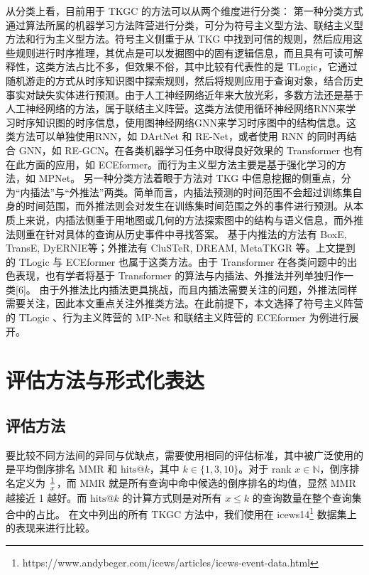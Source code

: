 \documentclass[a4paper, AutoFakeBold]{article}
\begin{document}
从分类上看，目前用于 TKGC 的方法可以从两个维度进行分类：
第一种分类方式通过算法所属的机器学习方法阵营进行分类，可分为符号主义型方法、联结主义型方法和行为主义型方法。符号主义侧重于从 TKG 中找到可信的规则，然后应用这些规则进行时序推理，其优点是可以发掘图中的固有逻辑信息，而且具有可读可解释性，这类方法占比不多，但效果不俗，其中比较有代表性的是 TLogic，它通过随机游走的方式从时序知识图中探索规则，然后将规则应用于查询对象，结合历史事实对缺失实体进行预测。由于人工神经网络近年来大放光彩，多数方法还是基于人工神经网络的方法，属于联结主义阵营。这类方法使用循环神经网络RNN来学习时序知识图的时序信息，使用图神经网络GNN来学习时序图中的结构信息。这类方法可以单独使用RNN，如 DArtNet\cite{5-2020} 和 RE-Net\cite{12-2020RefBlue}，或者使用 RNN 的同时再结合 GNN，如 RE-GCN\cite{7-2021}。在各类机器学习任务中取得良好效果的 Transformer 也有在此方面的应用，如 ECEformer\cite{6-2024RefBlue}。而行为主义型方法主要是基于强化学习的方法，如 MPNet\cite{4-2024RefBlue}。
另一种分类方法着眼于方法对 TKG 中信息挖掘的侧重点，分为“内插法”与“外推法”两类。简单而言，内插法预测的时间范围不会超过训练集自身的时间范围，而外推法则会对发生在训练集时间范围之外的事件进行预测。从本质上来说，内插法侧重于用地图或几何的方法探索图中的结构与语义信息，而外推法则重在针对具体的查询从历史事件中寻找答案。
基于内推法的方法有 BoxE\cite{14-2020}, TransE\cite{15-2024}, DyERNIE\cite{16-2020}等；外推法有 CluSTeR\cite{17-2021}, DREAM\cite{18-2023}, MetaTKGR\cite{13-2022} 等。上文提到的 TLogic 与 ECEformer 也属于这类方法。由于 Transformer 在各类问题中的出色表现，也有学者将基于 Transformer 的算法与内插法、外推法并列单独归作一类[6]。
由于外推法比内插法更具挑战，而且内插法需要关注的问题，外推法同样需要关注，因此本文重点关注外推类方法。在此前提下，本文选择了符号主义阵营的 TLogic 、行为主义阵营的 MP-Net 和联结主义阵营的 ECEformer 为例进行展开。


\section{评估方法与形式化表达}

\subsection{评估方法}

要比较不同方法间的异同与优缺点，需要使用相同的评估标准，其中被广泛使用的是平均倒序排名 MMR 和 $\text{hits}@k$，其中 $k\in\{1,3,10\}$。对于 rank $x\in{\mathbb N}$，倒序排名定义为 $1\over x$，而 MMR 就是所有查询中命中候选的倒序排名的均值，显然 MMR 越接近 1 越好。而 $\text{hits}@k$ 的计算方式则是对所有 $x\le k$ 的查询数量在整个查询集合中的占比。 在文中列出的所有 TKGC 方法中，我们使用在 icews14\footnote{https://www.andybeger.com/icews/articles/icews-event-data.html} 数据集上的表现来进行比较。
\end{document}
